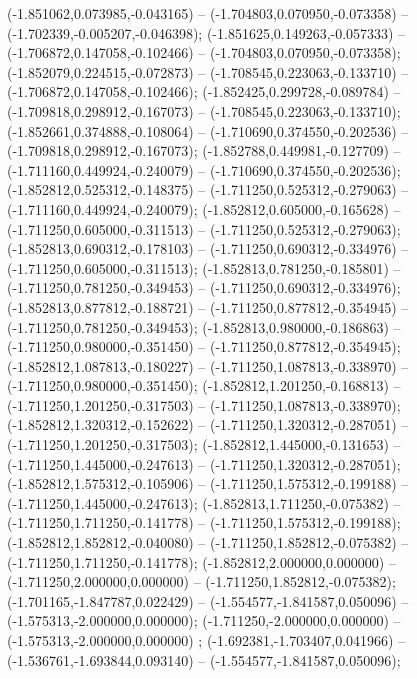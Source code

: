  (-1.851062,0.073985,-0.043165) -- (-1.704803,0.070950,-0.073358) -- (-1.702339,-0.005207,-0.046398);
 (-1.851625,0.149263,-0.057333) -- (-1.706872,0.147058,-0.102466) -- (-1.704803,0.070950,-0.073358);
 (-1.852079,0.224515,-0.072873) -- (-1.708545,0.223063,-0.133710) -- (-1.706872,0.147058,-0.102466);
 (-1.852425,0.299728,-0.089784) -- (-1.709818,0.298912,-0.167073) -- (-1.708545,0.223063,-0.133710);
 (-1.852661,0.374888,-0.108064) -- (-1.710690,0.374550,-0.202536) -- (-1.709818,0.298912,-0.167073);
 (-1.852788,0.449981,-0.127709) -- (-1.711160,0.449924,-0.240079) -- (-1.710690,0.374550,-0.202536);
 (-1.852812,0.525312,-0.148375) -- (-1.711250,0.525312,-0.279063) -- (-1.711160,0.449924,-0.240079);
 (-1.852812,0.605000,-0.165628) -- (-1.711250,0.605000,-0.311513) -- (-1.711250,0.525312,-0.279063);
 (-1.852813,0.690312,-0.178103) -- (-1.711250,0.690312,-0.334976) -- (-1.711250,0.605000,-0.311513);
 (-1.852813,0.781250,-0.185801) -- (-1.711250,0.781250,-0.349453) -- (-1.711250,0.690312,-0.334976);
 (-1.852813,0.877812,-0.188721) -- (-1.711250,0.877812,-0.354945) -- (-1.711250,0.781250,-0.349453);
 (-1.852813,0.980000,-0.186863) -- (-1.711250,0.980000,-0.351450) -- (-1.711250,0.877812,-0.354945);
 (-1.852812,1.087813,-0.180227) -- (-1.711250,1.087813,-0.338970) -- (-1.711250,0.980000,-0.351450);
 (-1.852812,1.201250,-0.168813) -- (-1.711250,1.201250,-0.317503) -- (-1.711250,1.087813,-0.338970);
 (-1.852812,1.320312,-0.152622) -- (-1.711250,1.320312,-0.287051) -- (-1.711250,1.201250,-0.317503);
 (-1.852812,1.445000,-0.131653) -- (-1.711250,1.445000,-0.247613) -- (-1.711250,1.320312,-0.287051);
 (-1.852812,1.575312,-0.105906) -- (-1.711250,1.575312,-0.199188) -- (-1.711250,1.445000,-0.247613);
 (-1.852813,1.711250,-0.075382) -- (-1.711250,1.711250,-0.141778) -- (-1.711250,1.575312,-0.199188);
 (-1.852812,1.852812,-0.040080) -- (-1.711250,1.852812,-0.075382) -- (-1.711250,1.711250,-0.141778);
 (-1.852812,2.000000,0.000000) -- (-1.711250,2.000000,0.000000) -- (-1.711250,1.852812,-0.075382);
 (-1.701165,-1.847787,0.022429) -- (-1.554577,-1.841587,0.050096) -- (-1.575313,-2.000000,0.000000);
 (-1.711250,-2.000000,0.000000) -- (-1.575313,-2.000000,0.000000) ;
 (-1.692381,-1.703407,0.041966) -- (-1.536761,-1.693844,0.093140) -- (-1.554577,-1.841587,0.050096);
